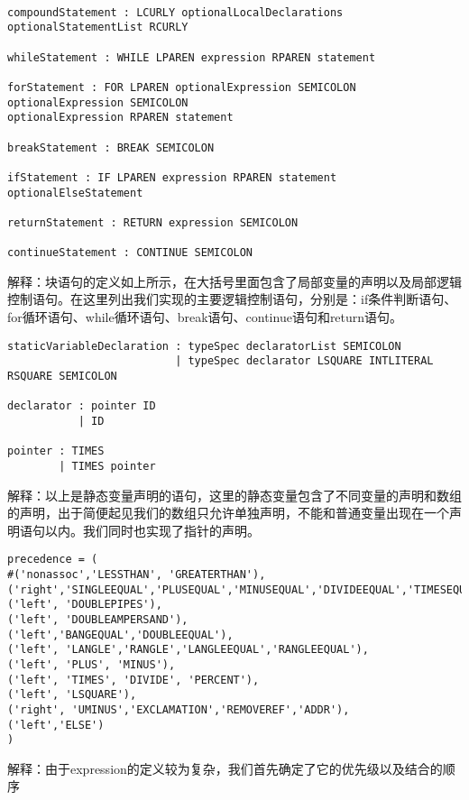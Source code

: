 \documentclass{article}
\begin{document}
\begin{verbatim}

compoundStatement : LCURLY optionalLocalDeclarations optionalStatementList RCURLY

whileStatement : WHILE LPAREN expression RPAREN statement

forStatement : FOR LPAREN optionalExpression SEMICOLON optionalExpression SEMICOLON 
optionalExpression RPAREN statement

breakStatement : BREAK SEMICOLON

ifStatement : IF LPAREN expression RPAREN statement optionalElseStatement

returnStatement : RETURN expression SEMICOLON

continueStatement : CONTINUE SEMICOLON

\end{verbatim}

解释：块语句的定义如上所示，在大括号里面包含了局部变量的声明以及局部逻辑控制语句。在这里列出我们实现的主要逻辑控制语句，分别是：if条件判断语句、for循环语句、while循环语句、break语句、continue语句和return语句。

\begin{verbatim}
staticVariableDeclaration : typeSpec declaratorList SEMICOLON
                          | typeSpec declarator LSQUARE INTLITERAL RSQUARE SEMICOLON

declarator : pointer ID
           | ID

pointer : TIMES
        | TIMES pointer
\end{verbatim}

解释：以上是静态变量声明的语句，这里的静态变量包含了不同变量的声明和数组的声明，出于简便起见我们的数组只允许单独声明，不能和普通变量出现在一个声明语句以内。我们同时也实现了指针的声明。

\begin{verbatim}
precedence = (
#('nonassoc','LESSTHAN', 'GREATERTHAN'),
('right','SINGLEEQUAL','PLUSEQUAL','MINUSEQUAL','DIVIDEEQUAL','TIMESEQUAL'),
('left', 'DOUBLEPIPES'),
('left', 'DOUBLEAMPERSAND'),
('left','BANGEQUAL','DOUBLEEQUAL'),
('left', 'LANGLE','RANGLE','LANGLEEQUAL','RANGLEEQUAL'),
('left', 'PLUS', 'MINUS'),
('left', 'TIMES', 'DIVIDE', 'PERCENT'),
('left', 'LSQUARE'),
('right', 'UMINUS','EXCLAMATION','REMOVEREF','ADDR'),
('left','ELSE')
)
\end{verbatim}

解释：由于expression的定义较为复杂，我们首先确定了它的优先级以及结合的顺序
\end{document}
